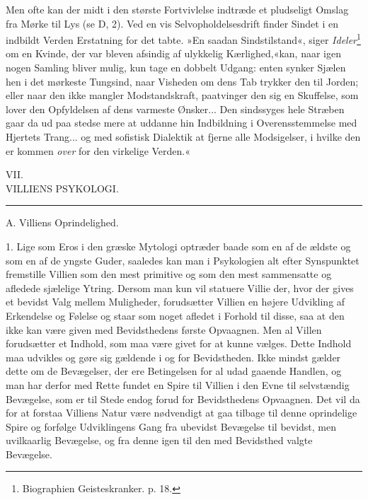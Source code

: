 \documentclass[12pt,a4paper,openany]{book}
\newcommand{\opage}[1]{\marginnote{\footnotesize\textit{[#1]}}}
\begin{document}
Men ofte kan der midt i den største Fortvivlelse indtræde et pludseligt
Omslag fra Mørke til Lys (se D, 2). Ved en vis Selvopholdelsesdrift
finder Sindet i en indbildt Verden Erstatning for det tabte. »En saadan
Sindstilstand«, siger \emph{Ideler}\footnote[2]{Biographien
Geisteskranker. p. 18.} om en Kvinde, der var bleven afsindig af
ulykkelig Kærlighed,«kan, naar igen nogen Samling bliver mulig, kun tage
en dobbelt Udgang: enten synker Sjælen hen i det mørkeste Tungsind, naar
Visheden om dens Tab trykker den
\opage{364}til Jorden; eller naar den ikke mangler Modstandskraft,
paatvinger den sig en Skuffelse, som lover den Opfyldelsen af dens
varmeste Ønsker... Den sindssyges hele Stræben gaar da ud paa stedse
mere at uddanne hin Indbildning i Overensstemmelse med Hjertets Trang...
og med sofistisk Dialektik at fjerne alle Modsigelser, i hvilke den er
kommen \emph{over} for den virkelige Verden.«

\clearpage
\opage{365}\begin{center}VII.\\[4pt] VILLIENS PSYKOLOGI.\\[2pt]\rule{1.5cm}{0.4pt}\end{center}

\begin{center}A. Villiens Oprindelighed.\end{center}

1. Lige som Eros i den græske Mytologi optræder baade som en af de
ældste og som en af de yngste Guder, saaledes kan man i Psykologien alt
efter Synspunktet fremstille Villien som den mest primitive og som den
mest sammensatte og afledede sjælelige Ytring. Dersom man kun vil
statuere Villie der, hvor der gives et bevidst Valg mellem Muligheder,
forudsætter Villien en højere Udvikling af Erkendelse og Følelse og
staar som noget afledet i Forhold til disse, saa at den ikke kan være
given med Bevidsthedens første Opvaagnen. Men al Villen forudsætter et
Indhold, som maa være givet for at kunne vælges. Dette Indhold maa
udvikles og gøre sig gældende i og for Bevidstheden. Ikke mindst gælder
dette om de Bevægelser, der ere Betingelsen for al udad gaaende Handlen,
og man har derfor med Rette fundet en Spire til Villien i den Evne til
selvstændig Bevægelse, som er til Stede endog forud for Bevidsthedens
Opvaagnen. Det vil da for at forstaa Villiens Natur være nødvendigt at
gaa tilbage til denne oprindelige Spire og forfølge Udviklingens Gang
fra ubevidst Bevægelse til bevidst, men uvilkaarlig Bevægelse, og fra
denne igen til den med Bevidsthed valgte Bevægelse.
\end{document}
